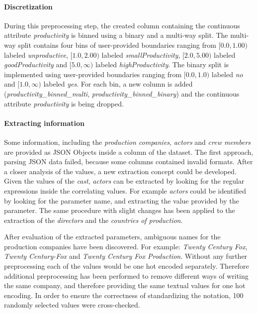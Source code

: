 \paragraph{Discretization}
During this preprocessing step, the created column containing the continuous attribute \textit{productivity} is binned using a binary and a multi-way split. The multi-way split contains four bins of user-provided boundaries ranging from $[0.0, 1.00)$ labeled \textit{unproductive}, $[1.0, 2.00)$ labeled \textit{smallProductivity}, $[2.0, 5.00)$ labeled \textit{goodProductivity} and $[5.0, \infty)$ labeled \textit{highProductivity}. The binary split is implemented using user-provided boundaries ranging from $[0.0, 1.0)$ labeled \textit{no} and $[1.0, \infty)$ labeled \textit{yes}. For each bin, a new column is added (\textit{productivity\_binned\_multi}, \textit{productivity\_binned\_binary}) and the continuous attribute \textit{productivity} is being dropped.

\paragraph{Extracting information}
Some information, including the \textit{production companies}, \textit{actors} and \textit{crew members} are provided as JSON Objects inside a column of the dataset. The first approach, parsing JSON data failed, because some columns contained invalid formats. After a closer analysis of the values, a new extraction concept could be developed. Given the values of the \textit{cast}, \textit{actors} can be extracted by looking for the regular expressions inside the correlating values. For example \textit{actors} could be identified by looking for the parameter name, and extracting the value provided by the parameter. The same procedure with slight changes has been applied to the extraction of the \textit{directors} and the \textit{countries of production}.

After evaluation of the extracted parameters, ambiguous names for the production companies have been discovered. For example: \textit{Twenty Century Fox}, \textit{Twenty Century-Fox} and \textit{Twenty Century Fox Production}. Without any further preprocessing each of the values would be one hot encoded separately. Therefore additional preprocessing has been performed to remove different ways of writing the same company, and therefore providing the same textual values for one hot encoding. In order to ensure the correctness of standardizing the notation, 100 randomly selected values were cross-checked.

